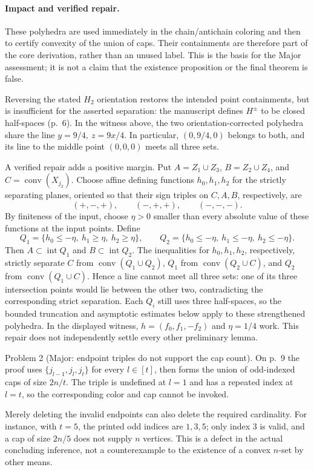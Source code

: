 \documentclass[10pt]{article}
\begin{document}
\paragraph*{Impact and verified repair.}\mbox{}\par
These polyhedra are used immediately in the chain/antichain coloring and then to certify convexity of the union of caps. Their containments are therefore part of the core derivation, rather than an unused label. This is the basis for the Major assessment; it is not a claim that the existence proposition or the final theorem is false.\par
Reversing the stated \(H_2\) orientation restores the intended point containments, but is insufficient for the asserted separation: the manuscript defines \(H^\pm\) to be closed half-spaces (p. 6). In the witness above, the two orientation-corrected polyhedra share the line \(y=9/4,\ z=9x/4\). In particular, \((0,9/4,0)\) belongs to both, and its line to the middle point \((0,0,0)\) meets all three sets.\par
A verified repair adds a positive margin. Put \(A=Z_1\cup Z_3\), \(B=Z_2\cup Z_4\), and \(C=\operatorname{conv}(X_{j_2})\). Choose affine defining functions \(h_0,h_1,h_2\) for the strictly separating planes, oriented so that their sign triples on \(C,A,B\), respectively, are \[(+,-,+),\qquad(-,+,+),\qquad(-,-,-).\] By finiteness of the input, choose \(\eta>0\) smaller than every absolute value of these functions at the input points. Define \[Q_1=\{h_0\le-\eta,\ h_1\ge\eta,\ h_2\ge\eta\},
 \qquad
 Q_2=\{h_0\le-\eta,\ h_1\le-\eta,\ h_2\le-\eta\}.\] Then \(A\subset\operatorname{int}Q_1\) and \(B\subset\operatorname{int}Q_2\). The inequalities for \(h_0,h_1,h_2\), respectively, strictly separate \(C\) from \(\operatorname{conv}(Q_1\cup Q_2)\), \(Q_1\) from \(\operatorname{conv}(Q_2\cup C)\), and \(Q_2\) from \(\operatorname{conv}(Q_1\cup C)\). Hence a line cannot meet all three sets: one of its three intersection points would lie between the other two, contradicting the corresponding strict separation. Each \(Q_i\) still uses three half-spaces, so the bounded truncation and asymptotic estimates below apply to these strengthened polyhedra. In the displayed witness, \(h=(f_0,f_1,-f_2)\) and \(\eta=1/4\) work. This repair does not independently settle every other preliminary lemma.\par
Problem 2 (Major: endpoint triples do not support the cap count).  On p. 9 the proof uses \(\{j_{l-1},j_l,j_t\}\) for every \(l\in[t]\), then forms the union of odd-indexed caps of size \(2n/t\). The triple is undefined at \(l=1\) and has a repeated index at \(l=t\), so the corresponding color and cap cannot be invoked.\par
Merely deleting the invalid endpoints can also delete the required cardinality. For instance, with \(t=5\), the printed odd indices are \(1,3,5\); only index \(3\) is valid, and a cap of size \(2n/5\) does not supply \(n\) vertices. This is a defect in the actual concluding inference, not a counterexample to the existence of a convex \(n\)-set by other means.\par
\end{document}
